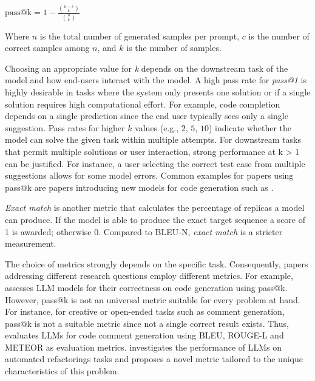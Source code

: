 $\text{pass@k} = 1 - \frac{\binom{n-c}{k}}{\binom{n}{k}}$

Where $n$ is the total number of generated samples per prompt, $c$ is the number of correct samples among  $n$, and $k$ is the number of samples.

Choosing an appropriate value for \emph{k} depends on the downstream task of the model and how end-users interact with the model.
A high pass rate for \emph{pass@1} is highly desirable in tasks where the system only presents one solution or if a single solution requires high computational effort.
For example, code completion depends on a single prediction since the end user typically sees only a single suggestion.
Pass rates for higher $k$ values (e.g., $2$, $5$, $10$) indicate whether the model can solve the given task within multiple attempts.
For downstream tasks that permit multiple solutions or user interaction, strong performance at k > 1 can be justified. 
For instance, a user selecting the correct test case from multiple suggestions allows for some model errors.
Common examples for papers using pass@k are papers introducing new models for code generation such as \cite{DBLP:journals/corr/abs-2308-12950, DBLP:journals/corr/abs-2401-14196, DBLP:journals/corr/abs-2409-12186, DBLP:journals/corr/abs-2305-06161}.

\emph{Exact match} is another metric that calculates the percentage of replicas a model can produce.
If the model is able to produce the exact target sequence a score of 1 is awarded; otherwise 0.
Compared to BLEU-N, \emph{exact match} is a stricter measurement.

The choice of metrics strongly depends on the specific task.
Consequently, papers addressing different research questions employ different metrics.
For example, \cite{DBLP:conf/nips/LiuXW023} assesses LLM models for their correctness on code generation using pass@k.
However, pass@k is not an universal metric suitable for every problem at hand.
For instance, for creative or open-ended tasks such as comment generation, pass@k is not a suitable metric since not a single correct result exists.
Thus, \cite{DBLP:conf/icse/GengWD00JML24} evaluates LLMs for code comment generation using BLEU, ROUGE-L and METEOR as evaluation metrics.
\cite{DBLP:journals/ase/LiuJZNLL25} investigates the performance of LLMs on automated refactorings tasks and proposes a novel metric tailored to the unique characteristics of this problem.


